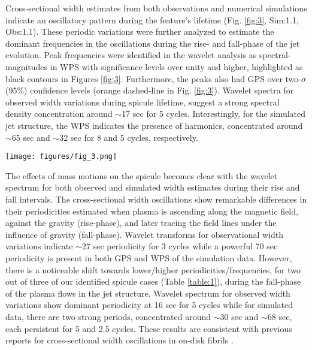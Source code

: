 \documentclass[12pt]{ociamthesis}
\begin{document}
Cross-sectional width estimates from both observations and numerical simulations indicate an oscillatory pattern during the feature’s lifetime (Fig. \ref{fig:3}, Sim:1.1, Obs:1.1). These periodic variations were further analyzed to estimate the dominant frequencies in the oscillations during the rise- and fall-phase of the jet evolution. Peak frequencies were identified in the wavelet analysis as spectral-magnitudes in WPS with significance levels over unity and higher, highlighted as black contours in Figures \ref{fig:3}. Furthermore, the peaks also had GPS over two-$\sigma$ (95\%) confidence levels (orange dashed-line in Fig. \ref{fig:3}). Wavelet spectra for observed width variations during spicule lifetime, suggest a strong spectral density concentration around $\sim$17 sec for 5 cycles. Interestingly, for the simulated jet structure, the WPS indicates the presence of harmonics, concentrated around $\sim$65 sec and $\sim$32 sec for 8 and 5 cycles, respectively. 

\begin{figure*}
\texttt{[image: figures/fig\_3.png]}
\caption{Panels showing the results of spectral analysis of cross-sectional width estimates of observed (top) and simulated (bottom) jet structures. Each panel depicts for temporal evolution of overall widths (1.1) and subsequent rise- (2.1) and fall-phases (3.1), along with Wavelet Power Spectra (WPS: 1.2, 2.2, 3.2) and Global Power Spectra (GPS: 1.3, 2.3, 3.3) during each phase of the evolution of the jet. Vertical red-line in plots (Obs: 1.1 and Sim 1.1) marks the time when the field-aligned plasma attained the apex height. Further, plots (Obs: 1.1, Sim: 3.2) provide clear indication of a second harmonic of the sausage waves confined in the dynamic spicular waveguide.}
\label{fig:3} 
\end{figure*}

The effects of mass motions on the spicule becomes clear with the wavelet spectrum for both observed and simulated width estimates during their rise and fall intervals. The cross-sectional width oscillations show remarkable differences in their periodicities estimated when plasma is ascending along the magnetic field, against the gravity (rise-phase), and later tracing the field lines under the influence of gravity (fall-phase). Wavelet transforms for observational width variations indicate $\sim$27 sec periodicity for 3 cycles while a powerful 70 sec periodicity is present in both GPS and WPS of the simulation data. However, there is a noticeable shift towards lower/higher periodicities/frequencies, for two out of three of our identified spicule cases (Table \ref{table:1}), during the fall-phase of the plasma flows in the jet structure. Wavelet spectrum for observed width variations show dominant periodicity at 16 sec for 5 cycles while for simulated data, there are two strong periods, concentrated around $\sim$30 sec and $\sim$68 sec, each persistent for 5 and 2.5 cycles. These results are consistent with previous reports for cross-sectional width oscillations in on-disk fibrils \citep{Gafeira2017}. 
\end{document}
